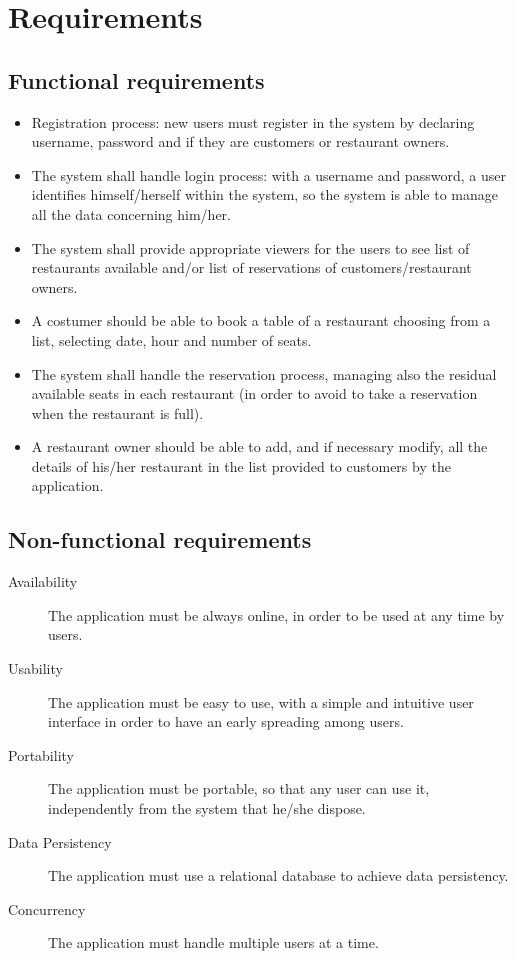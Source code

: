 \section{Requirements}

\subsection{Functional requirements}

\begin{itemize}
	\item Registration process: new users must register in the system by
		declaring username, password and if they are customers or
		restaurant owners.
	\item The system shall handle login process: with a username and
		password, a user identifies himself/herself within the system,
		so the system is able to manage all the data concerning him/her.
	\item The system shall provide appropriate viewers for the users to see
		list of restaurants available and/or list of reservations of
		customers/restaurant owners.
	\item A costumer should be able to book a table of a restaurant
		choosing from a list, selecting date, hour and number of seats.
	\item The system shall handle the reservation process, managing also the
		residual available seats in each restaurant (in order to avoid
		to take a reservation when the restaurant is full).
	\item A restaurant owner should be able to add, and if necessary modify,
		all the details of his/her restaurant in the list provided to
		customers by the application.
\end{itemize}

\subsection{Non-functional requirements}

\begin{description}
	\item[Availability] The application must be always online, in order to
		be used at any time by users.
	\item[Usability] The application must be easy to use, with a simple and
		intuitive user interface in order to have an early spreading
		among users.
	\item[Portability] The application must be portable, so that any user
		can use it, independently from the system that he/she dispose.
	\item[Data Persistency] The application must use a relational database
		to achieve data persistency.
	\item[Concurrency] The application must handle multiple users at a time.
\end{description}
